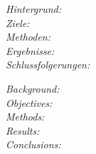 \begin{abstractDE}
\textit{Hintergrund:} \\

\textit{Ziele:} \\

\textit{Methoden:} \\

\textit{Ergebnisse:} \\

\textit{Schlussfolgerungen:} \\

\end{abstractDE}

\vfill

\begin{abstractEN}
\textit{Background:} \\

\textit{Objectives:} \\

\textit{Methods:} \\

\textit{Results:} \\

\textit{Conclusions:} \\
\end{abstractEN}

\vfill